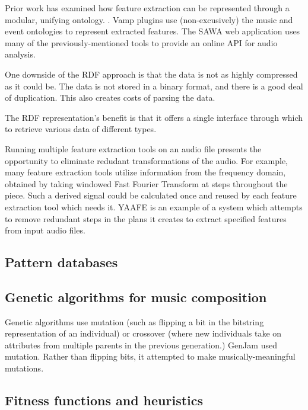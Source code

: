 \documentclass[11pt,conference,letterpaper]{IEEEtran}
\begin{document}
Prior work has examined how feature extraction can be represented through a modular, unifying ontology. \cite{raimond2008web}. Vamp plugins use (non-excusively) the music \cite{raimond2007music} and event \cite{raimond2007event} ontologies to represent extracted features. The SAWA web application \cite{fazekas2009reusable} uses many of the previously-mentioned tools to provide an online API for audio analysis.

One downside of the RDF approach is that the data is not as highly compressed as it could be. The data is not stored in a binary format, and there is a good deal of duplication. This also creates costs of parsing the data.

The RDF representation's benefit is that it offers a single interface through which to retrieve various data of different types.

Running multiple feature extraction tools on an audio file presents the opportunity to eliminate redudant transformations of the audio. For example, many feature extraction tools utilize information from the frequency domain, obtained by taking windowed Fast Fourier Transform at steps throughout the piece. Such a derived signal could be calculated once and reused by each feature extraction tool which needs it. YAAFE \cite{mathieu2010yaafe} is an example of a system which attempts to remove redundant steps in the plans it creates to extract specified features from input audio files.

\subsection{Pattern databases}

\subsection{Genetic algorithms for music composition}

Genetic algorithms use mutation (such as flipping a bit in the bitstring representation of an individual) or crossover (where new individuals take on attributes from multiple parents in the previous generation.) GenJam used mutation. Rather than flipping bits, it attempted to make musically-meaningful mutations.


\subsection{Fitness functions and heuristics}
\end{document}
